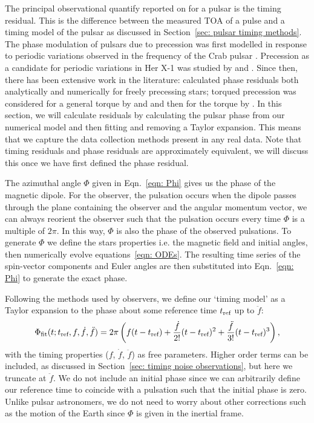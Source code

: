 \documentclass[../full_thesis/full_thesis.tex]{subfiles}
\begin{document}
The principal observational quantify reported on for a pulsar is the timing
residual. This is the difference between the measured TOA of a pulse and a
timing model of the pulsar as discussed in Section~\ref{sec: pulsar timing
methods}.  The phase modulation of pulsars due to precession was first modelled
in response to periodic variations observed in the frequency of the Crab pulsar
\citep{Ruderman1970, chiuderi1970shape}. Precession as a candidate for 
periodic variations in Her X-1 was
studied by \citet{bisnovatyi1990model} and \citet{bisnovatyi1993period}. Since
then, there has been extensive work in the literature: \citet{Nelson1990}
calculated phase residuals both analytically and numerically for freely
precessing stars; torqued precession was considered for a general torque by
\citet{Jones1988excitation} and \citet{Cordes1993} and then for the
\citet{Deutsch1955} torque by \citet{Melatos1999, Melatos2000}.  In this
section, we will calculate residuals by calculating the pulsar phase from our
numerical model and then fitting and removing a Taylor expansion. This means
that we capture the data collection methods present in any real
data. Note that timing residuals and phase residuals are approximately
equivalent, we will discuss this once we have first defined the phase residual.

The azimuthal angle $\Phi$ given in Eqn.~\eqref{eqn: Phi} gives us the phase of
the magnetic dipole. For the observer, the pulsation occurs when the dipole
passes through the plane containing the observer and the angular momentum
vector,  we can always reorient the observer such that the pulsation occurs
every time $\Phi$ is a multiple of $2\pi$. In this way, $\Phi$ is also the
phase of the observed pulsations. To generate $\Phi$ we define the stars
properties i.e. the magnetic field and initial angles, then numerically
evolve equations~\eqref{eqn: ODEs}. The resulting time series of the spin-vector
components and Euler angles are then substituted into Eqn.~\eqref{eqn: Phi} to
generate the exact phase.

Following the methods used by observers, we define our `timing model' as
a Taylor expansion to the phase about some reference time $t_{\textrm{ref}}$ up to $\ddot{f}$:
\begin{equation}
    \Phi_{\mathrm{fit}}(t; t_{\textrm{ref}}, f, \dot{f}, \ddot{f}) =
    2\pi \left(f(t - t_{\textrm{ref}}) +
                          \frac{\dot{f}}{2!}(t-t_{\textrm{ref}})^{2} +
                          \frac{\ddot{f}}{3!}(t-t_{\textrm{ref}})^{3}
                          \right),
\label{eqn: TR taylor expansion}
\end{equation}
with the timing properties ($f$, $\dot{f}$, $\ddot{f}$) as free parameters.
Higher order terms can be included, as discussed in Section~\ref{sec: timing noise
observations}, but here we truncate at $\ddot{f}$. We do not include an initial
phase since we can arbitrarily define our reference time to coincide with a
pulsation such that the initial phase is zero.  Unlike pulsar astronomers, we
do not need to worry about other corrections such as the motion of the Earth
since $\Phi$ is given in the inertial frame.
\end{document}
